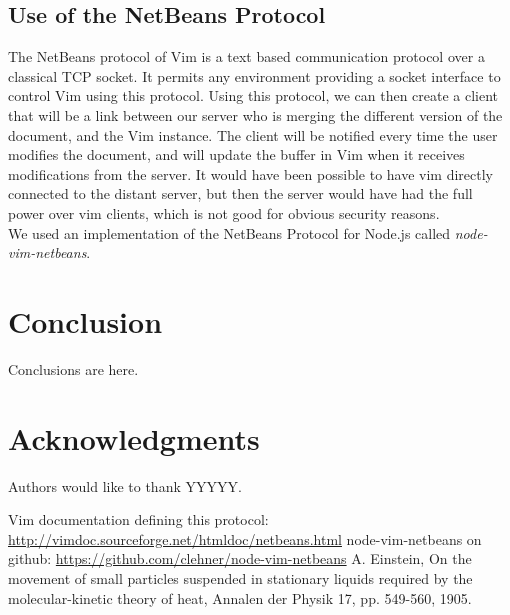 \documentclass{llncs}
\begin{document}
\subsection{Use of the NetBeans Protocol}

The NetBeans protocol of Vim is a text based communication protocol over a classical TCP socket. It permits any environment providing a socket interface to control Vim using this protocol.\cite{netbeans} Using this protocol, we can then create a client that will be a link between our server who is merging the different version of the document, and the Vim instance. The client will be notified every time the user modifies the document, and will update the buffer in Vim when it receives modifications from the server. It would have been possible to have vim directly connected to the distant server, but then the server would have had the full power over vim clients, which is not good for obvious security reasons.\\
We used an implementation of the NetBeans Protocol for Node.js called \textit{node-vim-netbeans}.


\section{Conclusion}\label{sec:Conclusion}

Conclusions are here.

\section*{Acknowledgments}\label{sec:Acknowledgments}

Authors would like to thank YYYYY.

\begin{thebibliography}{1}

Vim documentation defining this protocol: \url{http://vimdoc.sourceforge.net/htmldoc/netbeans.html}
node-vim-netbeans on github: \url{https://github.com/clehner/node-vim-netbeans}
A. Einstein, On the movement of small particles suspended in stationary liquids required by the molecular-kinetic theory of heat, Annalen der Physik 17, pp. 549-560, 1905.

\end{thebibliography}
\end{document}
